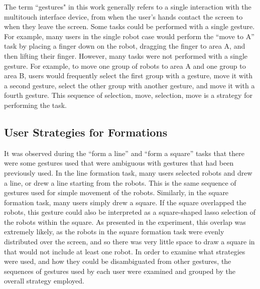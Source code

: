 The term ``gestures" in this work generally refers to a single interaction with the multitouch interface device, from when the user's hands contact the screen to when they leave the screen. 
Some tasks could be performed with a single gesture. 
For example, many users in the single robot case would perform the ``move to A'' task by placing a finger down on the robot, dragging the finger to area A, and then lifting their finger. 
However, many tasks were not performed with a single gesture. 
For example, to move one group of robots to area A and one group to area B, users would frequently select the first group with a gesture, move it with a second gesture, select the other group with another gesture, and move it with a fourth gesture. 
This sequence of selection, move, selection, move is a strategy for performing the task. 

\subsection{User Strategies for Formations}
It was observed during the ``form a line'' and ``form a square'' tasks that there were some gestures used that were ambiguous with gestures that had been previously used. 
In the line formation task, many users selected robots and drew a line, or drew a line starting from the robots. 
This is the same sequence of gestures used for simple movement of the robots.
Similarly, in the square formation task, many users simply drew a square. 
If the square overlapped the robots, this gesture could also be interpreted as a square-shaped lasso selection of the robots within the square. 
As presented in the experiment, this overlap was extremely likely, as the robots in the square formation task were evenly distributed over the screen, and so there was very little space to draw a square in that would not include at least one robot. 
In order to examine what strategies were used, and how they could be disambiguated from other gestures, the sequences of gestures used by each user were examined and grouped by the overall strategy employed. 

